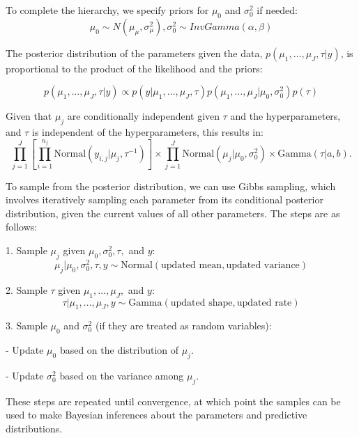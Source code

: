 \documentclass{article}
\begin{document}
 To complete the hierarchy, we specify priors for \( \mu_0 \) and \( \sigma^2_0 \) if needed:
$$ \mu_0 \sim N(\mu_\mu, \sigma^2_\mu) ,
\sigma^2_0 \sim InvGamma(\alpha, \beta) $$

The posterior distribution of the parameters given the data, \( p(\mu_1, \dots, \mu_J, \tau | y) \), is proportional to the product of the likelihood and the priors:

\[
p(\mu_1, \dots, \mu_J, \tau | y) \propto p(y | \mu_1, \dots, \mu_J, \tau) p(\mu_1, \dots, \mu_J | \mu_0, \sigma^2_0) p(\tau)
\]

Given that \( \mu_j \) are conditionally independent given \( \tau \) and the hyperparameters, and \( \tau \) is independent of the hyperparameters, this results in:
\[
\prod_{j=1}^J \left[ \prod_{i=1}^{n_j} \text{Normal}(y_{i,j} | \mu_j, \tau^{-1}) \right] \times \prod_{j=1}^J \text{Normal}(\mu_j | \mu_0, \sigma^2_0) \times \text{Gamma}(\tau | a, b).
\]



To sample from the posterior distribution, we can use Gibbs sampling, which involves iteratively sampling each parameter from its conditional posterior distribution, given the current values of all other parameters. The steps are as follows:

1. Sample \( \mu_j \) given \( \mu_0, \sigma^2_0, \tau, \) and \( y \):
   \[
   \mu_j | \mu_0, \sigma^2_0, \tau, y \sim \text{Normal}(\text{updated mean}, \text{updated variance})
   \]

2. Sample \( \tau \) given \( \mu_1, \dots, \mu_J, \) and \( y \):
   \[
   \tau | \mu_1, \dots, \mu_J, y \sim \text{Gamma}(\text{updated shape}, \text{updated rate})
   \]

3. Sample \( \mu_0 \) and \( \sigma^2_0 \) (if they are treated as random variables):\par
   - Update \( \mu_0 \) based on the distribution of \( \mu_j \).\par
   - Update \( \sigma^2_0 \) based on the variance among \( \mu_j \).

These steps are repeated until convergence, at which point the samples can be used to make Bayesian inferences about the parameters and predictive distributions.
\end{document}
